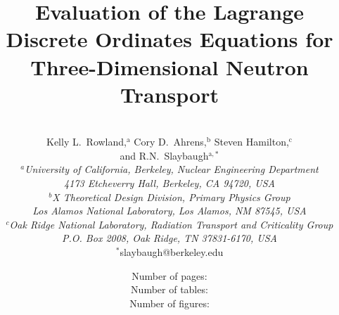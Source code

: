 \documentclass{article} %
\begin{document}

\title{Evaluation of the Lagrange Discrete Ordinates Equations for Three-Dimensional Neutron Transport} %


\author{
\vspace{20mm}
\\Kelly L.\ Rowland,$^{\text{a}}$  Cory D.\ Ahrens,$^\text{b}$ Steven Hamilton,$^\text{c}$ 
\\and R.N.\ Slaybaugh$^{\text{a},\ast}$\\[4pt] 
\textit{$^a$University of California, Berkeley, Nuclear Engineering Department}\\[-10pt]
\textit{4173 Etcheverry Hall, Berkeley, CA 94720, USA} \\[-5pt]
\textit{$^b$X Theoretical Design Division, Primary Physics Group}\\[-10pt]
\textit{Los Alamos National Laboratory, Los Alamos, NM 87545, USA}\\[-5pt]
\textit{$^c$Oak Ridge National Laboratory, Radiation Transport and Criticality Group} \\ [-10pt]
\textit{P.O. Box 2008, Oak Ridge, TN 37831-6170, USA} \\ [-2pt]
{$^\ast$slaybaugh@berkeley.edu}}       %

\date{
\vspace{40mm}
Number of pages: \pageref{LastPage} \\  
Number of tables: \totaltables \\
Number of figures: \totalfigures \\}                                                                                           

\maketitle
\end{document}
